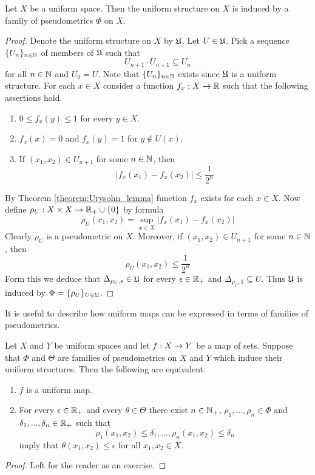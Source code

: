 \documentclass[10pt]{amsart}
\begin{document}
\begin{theorem}\label{theorem:each_uniform_structure_is_induced_by_pseudometrics}
	Let $X$ be a uniform space. Then the uniform structure on $X$ is induced by a family of pseudometrics $\Phi$ on $X$.
\end{theorem}
\begin{proof}
	Denote the uniform structure on $X$ by ${\mathfrak U}$. Let $U \in {\mathfrak U}$. Pick a sequence $\{U_n\}_{n\in {\mathbb N}}$ of members of ${\mathfrak U}$ such that
	$$U_{n+1}\cdot U_{n+1} \subseteq U_n$$
	for all $n \in {\mathbb N}$ and $U_0 = U$. Note that $\{U_n\}_{n\in {\mathbb N}}$ exists since ${\mathfrak U}$ is a uniform structure. For each $x \in X$ consider a function $f_x:X\rightarrow {\mathbb R}$ such that the following assertions hold.
	\begin{enumerate}[label=\textbf{(\arabic*)}, leftmargin=3.0em]
		\item $0\leq f_x(y) \leq 1$ for every $y \in X$.
		\item $f_x(x) = 0$ and $f_x(y) = 1$ for $y \not \in U(x)$.
		\item If $(x_1,x_2) \in U_{n+1}$ for some $n \in {\mathbb N}$, then
		      $$|f_x(x_1) - f_x(x_2)| \leq \frac{1}{2^n}$$
	\end{enumerate}
	By Theorem \ref{theorem:Urysohn_lemma} function $f_x$ exists for each $x \in X$. Now define $\rho_U:X\times X\rightarrow {\mathbb R}_+\cup \{0\}$ by formula
	$$\rho_U(x_1,x_2) = \sup_{x\in X}|f_x(x_1) - f_x(x_2)|$$
	Clearly $\rho_U$ is a pseudometric on $X$. Moreover, if $(x_1,x_2) \in U_{n+1}$ for some $n \in {\mathbb N}$, then
	$$\rho_U(x_1,x_2) \leq \frac{1}{2^n}$$
	Form this we deduce that $\Delta_{\rho_U, \epsilon} \in {\mathfrak U}$ for every $\epsilon \in {\mathbb R}_+$ and $\Delta_{\rho_U, 1}\subseteq U$. Thus ${\mathfrak U}$ is induced by $\Phi = \{\rho_U\}_{U \in {\mathfrak U}}$.
\end{proof}
\noindent
It is useful to describe how uniform maps can be expressed in terms of families of pseudometrics.

\begin{fact}\label{fact:uniform_maps_in_terms_of_pseudometrics}
	Let $X$ and $Y$ be uniform spaces and let $f:X\rightarrow Y$ be a map of sets. Suppose that $\Phi$ and $\Theta$ are families of pseudometrics on $X$ and $Y$ which induce their uniform structures. Then the following are equivalent.
	\begin{enumerate}[label=\emph{\textbf{(\roman*)}}, leftmargin=3.0em]
		\item $f$ is a uniform map.
		\item For every $\epsilon \in {\mathbb R}_+$ and every $\theta \in \Theta$ there exist $n \in {\mathbb N}_+$, $\rho_1,...,\rho_n \in \Phi$ and $\delta_1,...,\delta_n \in {\mathbb R}_+$ such that
		      $$\rho_1(x_1,x_2) \leq \delta_1,...,\rho_n(x_1, x_2) \leq \delta_n$$
		      imply that $\theta(x_1,x_2) \leq \epsilon$ for all $x_1,x_2 \in X$.
	\end{enumerate}
\end{fact}
\begin{proof}
	Left for the reader as an exercise.
\end{proof}
\end{document}
